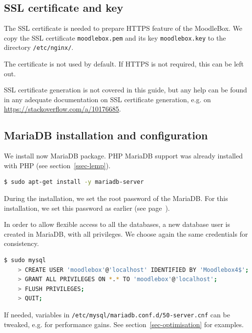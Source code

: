 \documentclass[12pt]{article}
\begin{document}
\subsection{SSL certificate and key}

The SSL certificate is needed to prepare HTTPS feature of the MoodleBox.
We copy the SSL certificate \lstinline{moodlebox.pem} and its key \lstinline{moodlebox.key} to the directory \lstinline{/etc/nginx/}.

The certificate is not used by default.
If HTTPS is not required, this can be left out.

SSL certificate generation is not covered in this guide, but any help can be 
found in any adequate documentation on SSL certificate generation, e.g. on \url{https://stackoverflow.com/a/10176685}.

\subsection{MariaDB installation and configuration}\label{ssec-mariadb}

We install now MariaDB package.
PHP MariaDB support was already installed with PHP (see section~\ref{ssec-lemp}).
\begin{lstlisting}[language=bash]
$ sudo apt-get install -y mariadb-server
\end{lstlisting}

During the installation, we set the root password of the MariaDB.
For this installation, we set this password as earlier (see page~\pageref{ssec-new-account}).

In order to allow flexible access to all the databases, a new database user is created in MariaDB, with all privileges.
We choose again the same credentials for consistency.

\begin{lstlisting}[language=bash]
$ sudo mysql
    > CREATE USER 'moodlebox'@'localhost' IDENTIFIED BY 'Moodlebox4$';
    > GRANT ALL PRIVILEGES ON *.* TO 'moodlebox'@'localhost';
    > FLUSH PRIVILEGES;
    > QUIT;
\end{lstlisting}

If needed, variables in \lstinline{/etc/mysql/mariadb.conf.d/50-server.cnf} can be tweaked, e.g. for performance gains. See section~\ref{sec-optimisation} for examples.
\end{document}
